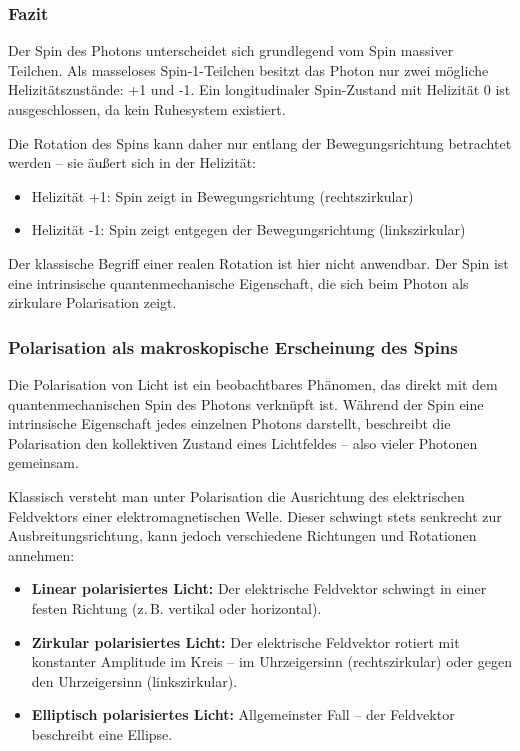 \subsubsection*{Fazit}
Der Spin des Photons unterscheidet sich grundlegend vom Spin massiver Teilchen. Als masseloses Spin-1-Teilchen besitzt das Photon nur zwei mögliche Helizitätszustände: +1 und -1. Ein longitudinaler Spin-Zustand mit Helizität 0 ist ausgeschlossen, da kein Ruhesystem existiert.

\vspace{0.5em}
Die Rotation des Spins kann daher nur entlang der Bewegungsrichtung betrachtet werden – sie äußert sich in der Helizität:

\begin{itemize}
	\item Helizität +1: Spin zeigt in Bewegungsrichtung (rechtszirkular)
	\item Helizität -1: Spin zeigt entgegen der Bewegungsrichtung (linkszirkular)
\end{itemize}

Der klassische Begriff einer realen Rotation ist hier nicht anwendbar. Der Spin ist eine intrinsische quantenmechanische Eigenschaft, die sich beim Photon als zirkulare Polarisation zeigt.

\subsubsection{Polarisation als makroskopische Erscheinung \newline des Spins}

Die Polarisation von Licht ist ein beobachtbares Phänomen, das direkt mit dem quantenmechanischen Spin des Photons verknüpft ist. Während der Spin eine intrinsische Eigenschaft jedes einzelnen Photons darstellt, beschreibt die Polarisation den kollektiven Zustand eines Lichtfeldes – also vieler Photonen gemeinsam.

\vspace{0.5em}
Klassisch versteht man unter Polarisation die Ausrichtung des elektrischen Feldvektors einer elektromagnetischen Welle. Dieser schwingt stets senkrecht zur Ausbreitungsrichtung, kann jedoch verschiedene Richtungen und Rotationen annehmen:

\begin{itemize}
	\item \textbf{Linear polarisiertes Licht:} Der elektrische Feldvektor schwingt in einer festen Richtung (z.\,B. vertikal oder horizontal).
	\item \textbf{Zirkular polarisiertes Licht:} Der elektrische Feldvektor rotiert mit konstanter Amplitude im Kreis – im Uhrzeigersinn (rechtszirkular) oder gegen den Uhrzeigersinn (linkszirkular).
	\item \textbf{Elliptisch polarisiertes Licht:} Allgemeinster Fall – der Feldvektor beschreibt eine Ellipse.
\end{itemize}

